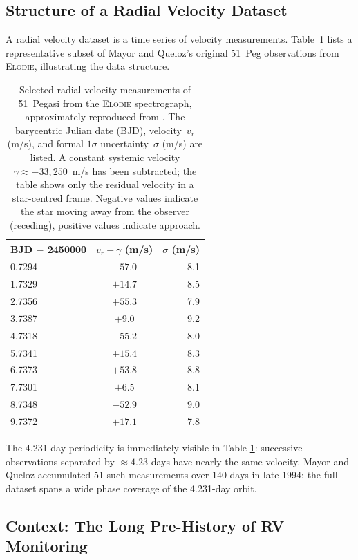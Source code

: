 \documentclass[12pt]{article}
\begin{document}
\subsection{Structure of a Radial Velocity Dataset}

A radial velocity dataset is a time series of velocity measurements.
Table~\ref{tab:51peg_data} lists a representative subset of Mayor and
Queloz's original 51~Peg observations from \textsc{Elodie}, illustrating
the data structure.

\begin{table}[ht]
\centering
\caption{Selected radial velocity measurements of 51~Pegasi from
the \textsc{Elodie} spectrograph, approximately reproduced from
\citet{Mayor1995}.  The barycentric Julian date (BJD), velocity~$v_r$
(m/s), and formal $1\sigma$ uncertainty~$\sigma$ (m/s) are listed.
A constant systemic velocity $\gamma \approx -33{,}250$~m/s has been
subtracted; the table shows only the residual velocity in a
star-centred frame.  Negative values indicate the star moving away from
the observer (receding), positive values indicate approach.}
\label{tab:51peg_data}
\medskip
\begin{tabular}{lcr}
\toprule
BJD $-$ 2450000 & $v_r - \gamma$ (m/s) & $\sigma$ (m/s) \\
\midrule
 0.7294 & $-57.0$  & 8.1 \\
 1.7329 & $+14.7$  & 8.5 \\
 2.7356 & $+55.3$  & 7.9 \\
 3.7387 & $+9.0$   & 9.2 \\
 4.7318 & $-55.2$  & 8.0 \\
 5.7341 & $+15.4$  & 8.3 \\
 6.7373 & $+53.8$  & 8.8 \\
 7.7301 & $+6.5$   & 8.1 \\
 8.7348 & $-52.9$  & 9.0 \\
 9.7372 & $+17.1$  & 7.8 \\
\bottomrule
\end{tabular}
\end{table}

The 4.231-day periodicity is immediately visible in Table
\ref{tab:51peg_data}: successive observations separated by $\approx 4.23$
days have nearly the same velocity.  Mayor and Queloz accumulated 51 such
measurements over 140 days in late 1994; the full dataset spans a wide
phase coverage of the 4.231-day orbit.

\subsection{Context: The Long Pre-History of RV Monitoring}
\end{document}
